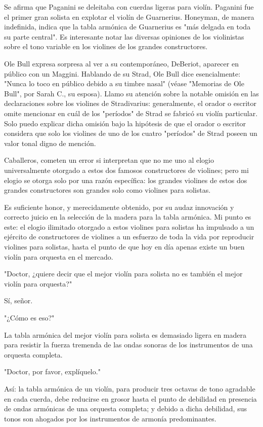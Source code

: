 \documentclass[12pt]{book}
\begin{document}
Se afirma que Paganini se deleitaba con cuerdas ligeras para violín. Paganini fue el primer gran solista en explotar el violín de Guarnerius. Honeyman, de manera indefinida, indica que la tabla armónica de Guarnerius es "más delgada en toda su parte central". Es interesante notar las diversas opiniones de los violinistas sobre el tono variable en los violines de los grandes constructores.

Ole Bull expresa sorpresa al ver a su contemporáneo, DeBeriot, aparecer en público con un Maggini. Hablando de su Strad, Ole Bull dice esencialmente: "Nunca lo toco en público debido a su timbre nasal" (véase "Memorias de Ole Bull", por Sarah C., su esposa). Llamo su atención sobre la notable omisión en las declaraciones sobre los violines de Stradivarius: generalmente, el orador o escritor omite mencionar en cuál de los "períodos" de Strad se fabricó su violín particular. Solo puedo explicar dicha omisión bajo la hipótesis de que el orador o escritor considera que solo los violines de uno de los cuatro "períodos" de Strad poseen un valor tonal digno de mención.

Caballeros, cometen un error si interpretan que no me uno al elogio universalmente otorgado a estos dos famosos constructores de violines; pero mi elogio se otorga solo por una razón específica: los grandes violines de estos dos grandes constructores son grandes solo como violines para solistas.

Es suficiente honor, y merecidamente obtenido, por su audaz innovación y correcto juicio en la selección de la madera para la tabla armónica. Mi punto es este: el elogio ilimitado otorgado a estos violines para solistas ha impulsado a un ejército de constructores de violines a un esfuerzo de toda la vida por reproducir violines para solistas, hasta el punto de que hoy en día apenas existe un buen violín para orquesta en el mercado.

"Doctor, ¿quiere decir que el mejor violín para solista no es también el mejor violín para orquesta?"

Sí, señor.

"¿Cómo es eso?"

La tabla armónica del mejor violín para solista es demasiado ligera en madera para resistir la fuerza tremenda de las ondas sonoras de los instrumentos de una orquesta completa.

"Doctor, por favor, explíquelo."

Así: la tabla armónica de un violín, para producir tres octavas de tono agradable en cada cuerda, debe reducirse en grosor hasta el punto de debilidad en presencia de ondas armónicas de una orquesta completa; y debido a dicha debilidad, sus tonos son ahogados por los instrumentos de armonía predominantes.
\end{document}
